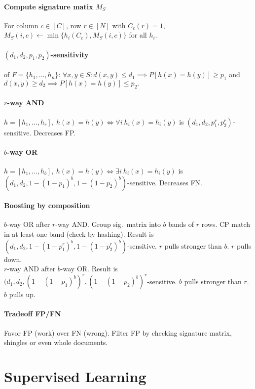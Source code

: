 \documentclass[10pt]{scrartcl}
\begin{document}
\begin{multicols}{3}
\paragraph{Compute signature matix $M_S$}
For column $c \in [C]$, row $r \in [N]$ with $C_c(r) = 1$, $M_S(i,c) \leftarrow \min\{h_i(C_c), M_S(i,c)\}$ for all $h_i$.

\paragraph{$(d_1,d_2,p_1,p_2)$-sensitivity} of $F = \{h_1,\dots,h_n\}$: $\forall x,y \in S: d(x,y) \leq d_1 \implies P[h(x)=h(y)] \geq p_1$ and $d(x,y) \geq d_2 \implies P[h(x)=h(y)] \leq p_2.$
\paragraph{$r$-way AND}
$h = [h_1,\dots,h_r],\ h(x) = h(y) \Leftrightarrow \forall i\ h_i(x) = h_i(y)$ is $(d_1,d_2,p_1^r,p_2^r)$-sensitive. Decreases FP.
\paragraph{$b$-way OR}
$h = [h_1,\dots,h_b],\ h(x) = h(y) \Leftrightarrow \exists i\ h_i(x) = h_i(y)$ is $(d_1,d_2,1-(1-p_1)^b,1-(1-p_2)^b)$-sensitive. Decreases FN.

\paragraph{Boosting by composition}
$b$-way OR after $r$-way AND.
Group sig.\ matrix into $b$ bands of $r$ rows.
CP match in at least one band (check by hashing).
Result is $(d_1,d_2,1-(1-p_1^r)^b,1-(1-p_2^r)^b)$-sensitive. $r$ pulls stronger than $b$. $r$ pulls down.
\\
$r$-way AND after $b$-way OR.
Result is $(d_1,d_2,(1-(1-p_1)^b)^r,(1-(1-p_2)^b)^r$-sensitive. $b$ pulls stronger than $r$. $b$ pulls up.

\paragraph{Tradeoff FP/FN}
Favor FP (work) over FN (wrong).
Filter FP by checking signature matrix, shingles or even whole documents.


\section{Supervised Learning}

\end{multicols}
\end{document}
